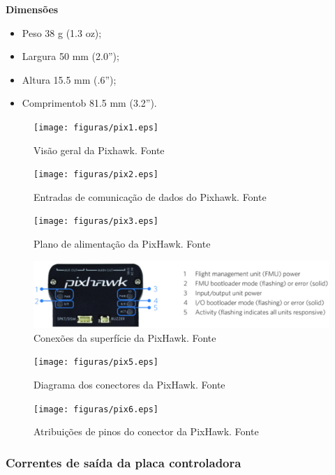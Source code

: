 \textbf{Dimensões}
\begin{itemize}
\item Peso 38 g (1.3 oz);
\item Largura 50 mm (2.0”);
\item Altura 15.5 mm (.6”);
\item Comprimentob 81.5 mm (3.2”).
\end{itemize}
\begin{figure}[H]
	\centering
	  \texttt{[image: figuras/pix1.eps]}
	\caption{Visão geral da Pixhawk. Fonte \cite{pixhawk}}
	\label{fig:pix1}
\end{figure}

\begin{figure}[H]
	\centering
	  \texttt{[image: figuras/pix2.eps]}
	\caption{Entradas  de comunicação de dados  do Pixhawk. Fonte \cite{pixhawk}}
	\label{fig:pix2}
\end{figure}

\pagebreak
\begin{figure}[H]
	\centering
	  \texttt{[image: figuras/pix3.eps]}
	\caption{Plano de alimentação da PixHawk. Fonte \cite{pixhawk}}
	\label{fig:pix3}
\end{figure}

\begin{figure}[H]
	\centering
	  \includegraphics[keepaspectratio=true,scale=0.6]{figuras/pix4.eps}
	\caption{Conexões da superfície da PixHawk. Fonte \cite{pixhawk}}
	\label{fig:pix4}
\end{figure}

\begin{figure}[H]
	\centering
	  \texttt{[image: figuras/pix5.eps]}
	\caption{Diagrama dos conectores da PixHawk. Fonte \cite{pixhawk}}
	\label{fig:pix5}
\end{figure}

\begin{figure}[H]
	\centering
	  \texttt{[image: figuras/pix6.eps]}
	\caption{Atribuições de pinos do conector da PixHawk. Fonte \cite{pixhawk}}
	\label{fig:pix6}
\end{figure}

\subsubsection{Correntes de saída da placa controladora}

